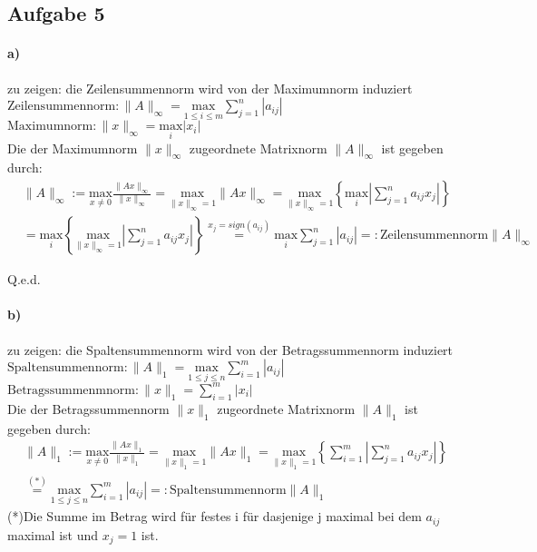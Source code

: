 \newpage
\subsection*{Aufgabe 5}
\paragraph*{a)}
zu zeigen: die Zeilensummennorm wird von der Maximumnorm induziert\\
\newline
$\mathrm{Zeilensummennorm: }\|A\|_\infty=\underset{1 \le i \le m}{\mathrm{max}} \sum_{j=1}^{n}|a_{ij}|$\\
\newline
$\mathrm{Maximumnorm: }\|x\|_\infty=\underset{i}{\mathrm{max}} |x_{i}|$\\
\newline
Die der Maximumnorm $\|x\|_\infty$ zugeordnete Matrixnorm $\|A\|_\infty$ ist gegeben durch:
\begin{align*}
&\|A\|_\infty := \underset{x\neq 0}{\mathrm{max}} \frac{\|Ax\|_\infty}{\|x\|_\infty} = 
\underset{\|x\|_\infty=1}{\mathrm{max}} \|Ax\|_\infty =
\underset{\|x\|_\infty=1}{\mathrm{max}}\left\lbrace \underset{i}{\mathrm{max}}\left|\sum_{j=1}^{n}a_{ij}x_j\right|\right\rbrace\\&=
\underset{i}{\mathrm{max}}\left\lbrace\underset{\|x\|_\infty=1}{\mathrm{max}}\left|\sum_{j=1}^{n} a_{ij}x_j\right|\right\rbrace
\overset{x_j=sign(a_{ij})}{=}\underset{i}{\mathrm{max}}\sum_{j=1}^{n}|a_{ij}|=: \mathrm{Zeilensummennorm} \|A\|_\infty
\end{align*}
\begin{flushright}Q.e.d.\end{flushright}

\paragraph*{b)}
zu zeigen: die Spaltensummennorm wird von der Betragssummennorm induziert\\
\newline
$\mathrm{Spaltensummennorm: }\|A\|_1=\underset{1 \le j \le n}{\mathrm{max}} \sum_{i=1}^{m}|a_{ij}|$\\
\newline
$\mathrm{Betragssummenmnorm: }\|x\|_1=\sum_{i=1}^{m}|x_i|$\\
\newline
Die der Betragssummennorm $\|x\|_1$ zugeordnete Matrixnorm $\|A\|_1$ ist gegeben durch:
\begin{align}
\|A\|_1 := \underset{x\neq 0}{\mathrm{max}} \frac{\|Ax\|_1}{\|x\|_1} = \underset{\|x\|_1=1}{\mathrm{max}} \|Ax\|_1 = \underset{\|x\|_1=1}{\mathrm{max}}\left\lbrace\sum_{i=1}^{m}\left|\sum_{j=1}^{n}a_{ij}x_j\right|\right\rbrace \\
\overset{(*)}{=} \underset{1 \le j \le n}{\mathrm{max}} \sum_{i=1}^{m}|a_{ij}| =: \mathrm{Spaltensummennorm} \|A\|_1
\end{align}
(*)Die Summe im Betrag wird f\"ur festes i f\"ur dasjenige j maximal bei dem $a_{ij}$ maximal ist und $x_j = 1$ ist.